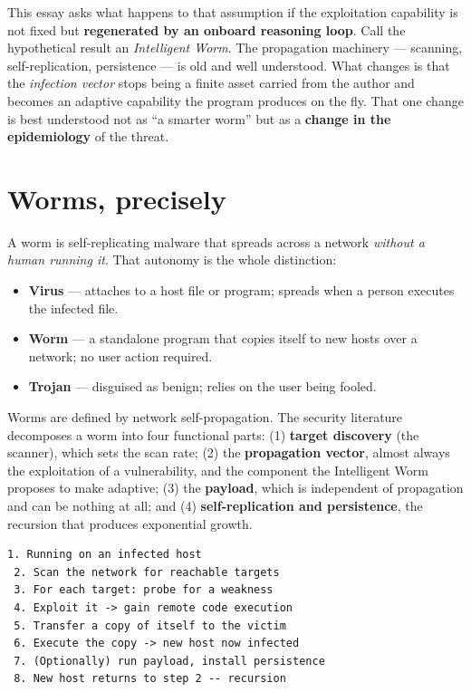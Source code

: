 \documentclass[11pt,a4paper]{article}
\begin{document}
This essay asks what happens to that assumption if the exploitation capability is not fixed but \textbf{regenerated by an onboard reasoning loop}. Call the hypothetical result an \emph{Intelligent Worm}. The propagation machinery --- scanning, self-replication, persistence --- is old and well understood. What changes is that the \emph{infection vector} stops being a finite asset carried from the author and becomes an adaptive capability the program produces on the fly. That one change is best understood not as ``a smarter worm'' but as a \textbf{change in the epidemiology} of the threat.

\section{Worms, precisely}

A worm is self-replicating malware that spreads across a network \emph{without a human running it}. That autonomy is the whole distinction:

\begin{itemize}[nosep]
  \item \textbf{Virus} --- attaches to a host file or program; spreads when a person executes the infected file.
  \item \textbf{Worm} --- a standalone program that copies itself to new hosts over a network; no user action required.
  \item \textbf{Trojan} --- disguised as benign; relies on the user being fooled.
\end{itemize}

Worms are defined by network self-propagation. The security literature decomposes a worm into four functional parts: (1) \textbf{target discovery} (the scanner), which sets the scan rate; (2) the \textbf{propagation vector}, almost always the exploitation of a vulnerability, and the component the Intelligent Worm proposes to make adaptive; (3) the \textbf{payload}, which is independent of propagation and can be nothing at all; and (4) \textbf{self-replication and persistence}, the recursion that produces exponential growth.

\begin{Verbatim}[frame=single,fontsize=\small]
 1. Running on an infected host
 2. Scan the network for reachable targets
 3. For each target: probe for a weakness
 4. Exploit it -> gain remote code execution
 5. Transfer a copy of itself to the victim
 6. Execute the copy -> new host now infected
 7. (Optionally) run payload, install persistence
 8. New host returns to step 2 -- recursion
\end{Verbatim}
\end{document}
